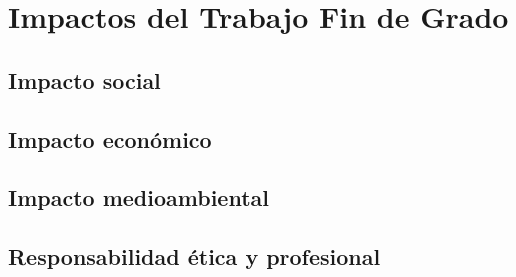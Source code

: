 \chapter{Impactos del Trabajo Fin de Grado}

\section{Impacto social}

\section{Impacto económico}

\section{Impacto medioambiental}

\section{Responsabilidad ética y profesional}

\clearpage
\newpage
